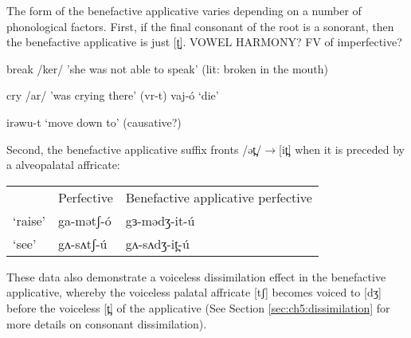 
The form of the benefactive applicative varies depending on a number of phonological factors. First, if the final consonant of the root is a sonorant, then the benefactive applicative is just [t̺]. VOWEL HARMONY? FV of imperfective?

 
break /ker/ 'she was not able to speak' (lit: broken in the mouth)

cry /ar/  'was crying there' (vr-t)
vaj-ó `die'


irəwu-t `move down to' (causative?)

%

Second, the benefactive applicative suffix fronts /ət̪/$\to$[it̪] when it is preceded by a alveopalatal affricate:
\ea
\begin{tabular}[t]{lll}
&	Perfective	&	Benefactive applicative perfective\\
‘raise’ 		& ga-mətʃ-ó		&	gɜ-mədʒ-it-ú\\
‘see’	&	gʌ-sʌtʃ-ú		& 	gʌ-sʌdʒ-it̪-ú	\\
\end{tabular}
\z

These data also demonstrate a voiceless dissimilation effect in the benefactive applicative, whereby the voiceless palatal affricate [tʃ] becomes voiced to [dʒ] before the voiceless [t̪] of the applicative (See Section \ref{sec:ch5:dissimilation} for more details on consonant dissimilation).

